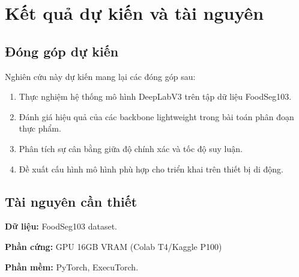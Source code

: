 \section{Kết quả dự kiến và tài nguyên}
\label{results}

\subsection{Đóng góp dự kiến}

Nghiên cứu này dự kiến mang lại các đóng góp sau:
\begin{enumerate}
    \item Thực nghiệm hệ thống mô hình DeepLabV3 trên tập dữ liệu FoodSeg103.
    \item Đánh giá hiệu quả của các backbone lightweight trong bài toán phân đoạn thực phẩm.
    \item Phân tích sự cân bằng giữa độ chính xác và tốc độ suy luận.
    \item Đề xuất cấu hình mô hình phù hợp cho triển khai trên thiết bị di động.
\end{enumerate}

\subsection{Tài nguyên cần thiết}

\textbf{Dữ liệu:} FoodSeg103 dataset.

\textbf{Phần cứng:} GPU 16GB VRAM (Colab T4/Kaggle P100)


\textbf{Phần mềm:} PyTorch, ExecuTorch.

